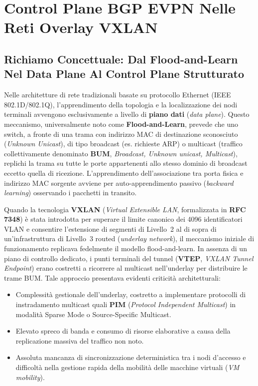\documentclass[11pt, a4paper]{article}
\begin{document}


\section{Control Plane BGP EVPN Nelle Reti Overlay VXLAN}

\subsection{Richiamo Concettuale: Dal Flood-and-Learn Nel Data Plane Al Control Plane Strutturato}

Nelle architetture di rete tradizionali basate su protocollo Ethernet (IEEE 802.1D/802.1Q), l'apprendimento della topologia e la localizzazione dei nodi terminali avvengono esclusivamente a livello di \textbf{piano dati} (\emph{data plane}). Questo meccanismo, universalmente noto come \textbf{Flood-and-Learn}, prevede che uno switch, a fronte di una trama con indirizzo MAC di destinazione sconosciuto (\emph{Unknown Unicast}), di tipo broadcast (es. richieste ARP) o multicast (traffico collettivamente denominato \textbf{BUM}, \emph{Broadcast, Unknown unicast, Multicast}), replichi la trama su tutte le porte appartenenti allo stesso dominio di broadcast eccetto quella di ricezione. L'apprendimento dell'associazione tra porta fisica e indirizzo MAC sorgente avviene per auto-apprendimento passivo (\emph{backward learning}) osservando i pacchetti in transito.

Quando la tecnologia \textbf{VXLAN} (\emph{Virtual Extensible LAN}, formalizzata in \textbf{RFC 7348}) è stata introdotta per superare il limite canonico dei \num{4096} identificatori VLAN e consentire l'estensione di segmenti di Livello~2 al di sopra di un'infrastruttura di Livello~3 routed (\emph{underlay network}), il meccanismo iniziale di funzionamento replicava fedelmente il modello flood-and-learn. In assenza di un piano di controllo dedicato, i punti terminali del tunnel (\textbf{VTEP}, \emph{VXLAN Tunnel Endpoint}) erano costretti a ricorrere al multicast nell'underlay per distribuire le trame BUM. Tale approccio presentava evidenti criticità architetturali:
\begin{itemize}[noitemsep]
    \item Complessità gestionale dell'underlay, costretto a implementare protocolli di instradamento multicast quali \textbf{PIM} (\emph{Protocol Independent Multicast}) in modalità Sparse Mode o Source-Specific Multicast.
    \item Elevato spreco di banda e consumo di risorse elaborative a causa della replicazione massiva del traffico non noto.
    \item Assoluta mancanza di sincronizzazione deterministica tra i nodi d'accesso e difficoltà nella gestione rapida della mobilità delle macchine virtuali (\emph{VM mobility}).
\end{itemize}
\end{document}
